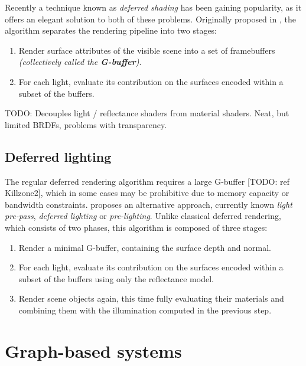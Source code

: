 Recently a technique known as \emph{deferred shading} has been gaining popularity, as it offers an elegant solution to both of these problems. Originally proposed in \citet{DeeringDeferred}, the algorithm separates the rendering pipeline into two stages:

\begin{enumerate}
\item Render surface attributes of the visible scene into a set of framebuffers \emph{(collectively called the \textbf{G-buffer})}.
\item For each light, evaluate its contribution on the surfaces encoded within a subset of the buffers.
\end{enumerate}

TODO: Decouples light / reflectance shaders from material shaders. Neat, but limited BRDFs, problems with transparency.

\subsection{Deferred lighting}

The regular deferred rendering algorithm requires a large G-buffer [TODO: ref Killzone2], which in some cases may be prohibitive due to memory capacity or bandwidth constraints. \citet{Engel08PrePass} proposes an alternative approach, currently known \emph{light pre-pass}, \emph{deferred lighting} or \emph{pre-lighting}. Unlike classical deferred rendering, which consists of two phases, this algorithm is composed of three stages:

\begin{enumerate}
\item Render a minimal G-buffer, containing the surface depth and normal.
\item For each light, evaluate its contribution on the surfaces encoded within a subset of the buffers using only the reflectance model.
\item Render scene objects again, this time fully evaluating their materials and combining them with the illumination computed in the previous step.
\end{enumerate}


\section{Graph-based systems}


